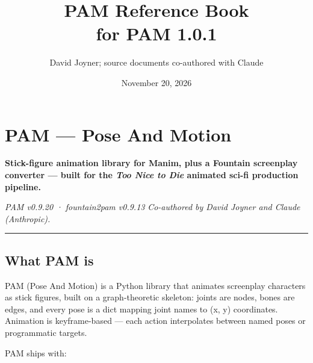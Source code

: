 \documentclass[
  12pt,
  letterpaper,
]{book}
\title{PAM Reference Book\\[0.4em]\normalsize for PAM 1.0.1}
\author{David Joyner; source documents co-authored with Claude}
\date{November 20, 2026}
\begin{document}
\frontmatter
\maketitle

{
\hypersetup{linkcolor=}
\setcounter{tocdepth}{3}
\tableofcontents
}
\mainmatter
\chapter{PAM --- Pose And Motion}\label{pam-pose-and-motion}

\textbf{Stick-figure animation library for Manim, plus a Fountain
screenplay converter --- built for the \emph{Too Nice to Die} animated
sci-fi production pipeline.}

\emph{PAM v0.9.20 · fountain2pam v0.9.13} \emph{Co-authored by David
Joyner and Claude (Anthropic).}

\begin{center}\rule{0.5\linewidth}{0.5pt}\end{center}

\section{What PAM is}\label{what-pam-is}

PAM (Pose And Motion) is a Python library that animates screenplay
characters as stick figures, built on a graph-theoretic skeleton: joints
are nodes, bones are edges, and every pose is a dict mapping joint names
to (x, y) coordinates. Animation is keyframe-based --- each action
interpolates between named poses or programmatic targets.

PAM ships with:
\end{document}
